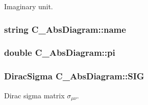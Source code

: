 Imaginary unit. 

\hypertarget{class_c___abs_diagram_a919d23735a009dc5a78e02e01e1eb40b}{
\subsubsection[{name}]{\setlength{\rightskip}{0pt plus 5cm}string C\-\_\-\-Abs\-Diagram\-::name\hspace{0.3cm}{\ttfamily [protected]}}}\label{class_c___abs_diagram_a919d23735a009dc5a78e02e01e1eb40b}
\hypertarget{class_c___abs_diagram_a3e24081668fb3198fd043dd291fba4c5}{
\subsubsection[{pi}]{\setlength{\rightskip}{0pt plus 5cm}double C\-\_\-\-Abs\-Diagram\-::pi\hspace{0.3cm}{\ttfamily [protected]}}}\label{class_c___abs_diagram_a3e24081668fb3198fd043dd291fba4c5}
\hypertarget{class_c___abs_diagram_ac4646ab596ff13dd531f28f755d3dd4e}{
\subsubsection[{S\-I\-G}]{\setlength{\rightskip}{0pt plus 5cm}Dirac\-Sigma C\-\_\-\-Abs\-Diagram\-::\-S\-I\-G\hspace{0.3cm}{\ttfamily [protected]}}}\label{class_c___abs_diagram_ac4646ab596ff13dd531f28f755d3dd4e}


Dirac sigma matrix $ \sigma_{\mu\nu} $. 

